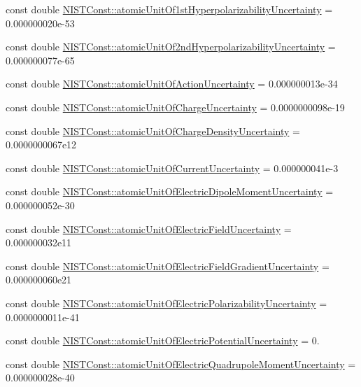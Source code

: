 \begin{DoxyCompactItemize}
const double \hyperlink{group___atomic_unit_ga6763b09c4e925292e6a3a22b93a53abd}{N\+I\+S\+T\+Const\+::atomic\+Unit\+Of1st\+Hyperpolarizability\+Uncertainty} = 0.\+000000020e-\/53
\item 
const double \hyperlink{group___atomic_unit_ga0977fcc84fb0f3d50f77493053fba633}{N\+I\+S\+T\+Const\+::atomic\+Unit\+Of2nd\+Hyperpolarizability\+Uncertainty} = 0.\+000000077e-\/65
\item 
const double \hyperlink{group___atomic_unit_ga23528f5eb51ef25537027bf44e12663c}{N\+I\+S\+T\+Const\+::atomic\+Unit\+Of\+Action\+Uncertainty} = 0.\+000000013e-\/34
\item 
const double \hyperlink{group___atomic_unit_ga681051e6abc6de4aaa406fd9e6904730}{N\+I\+S\+T\+Const\+::atomic\+Unit\+Of\+Charge\+Uncertainty} = 0.\+0000000098e-\/19
\item 
const double \hyperlink{group___atomic_unit_ga3038b11b5fde2681f59e7dbbe32a44ab}{N\+I\+S\+T\+Const\+::atomic\+Unit\+Of\+Charge\+Density\+Uncertainty} = 0.\+0000000067e12
\item 
const double \hyperlink{group___atomic_unit_gaef0b7cef2d2f63889e17b26d37173d3d}{N\+I\+S\+T\+Const\+::atomic\+Unit\+Of\+Current\+Uncertainty} = 0.\+000000041e-\/3
\item 
const double \hyperlink{group___atomic_unit_ga28f3032fb8b6493d0852db40efeaff9e}{N\+I\+S\+T\+Const\+::atomic\+Unit\+Of\+Electric\+Dipole\+Moment\+Uncertainty} = 0.\+000000052e-\/30
\item 
const double \hyperlink{group___atomic_unit_ga12048ba2381ea4da6842027fd918b6d0}{N\+I\+S\+T\+Const\+::atomic\+Unit\+Of\+Electric\+Field\+Uncertainty} = 0.\+000000032e11
\item 
const double \hyperlink{group___atomic_unit_gab460c44de9b3fd957cd959cce3545631}{N\+I\+S\+T\+Const\+::atomic\+Unit\+Of\+Electric\+Field\+Gradient\+Uncertainty} = 0.\+000000060e21
\item 
const double \hyperlink{group___atomic_unit_ga2ef1ea59315d53669e7c5e38fc4dc6b7}{N\+I\+S\+T\+Const\+::atomic\+Unit\+Of\+Electric\+Polarizability\+Uncertainty} = 0.\+0000000011e-\/41
\item 
const double \hyperlink{group___atomic_unit_ga8cf4868d1230d8d02c6d7af0eccc1d24}{N\+I\+S\+T\+Const\+::atomic\+Unit\+Of\+Electric\+Potential\+Uncertainty} = 0.
\item 
const double \hyperlink{group___atomic_unit_gad42ce210c0b077347928b32c3d9357f3}{N\+I\+S\+T\+Const\+::atomic\+Unit\+Of\+Electric\+Quadrupole\+Moment\+Uncertainty} = 0.\+000000028e-\/40
\item 

\end{DoxyCompactItemize}
